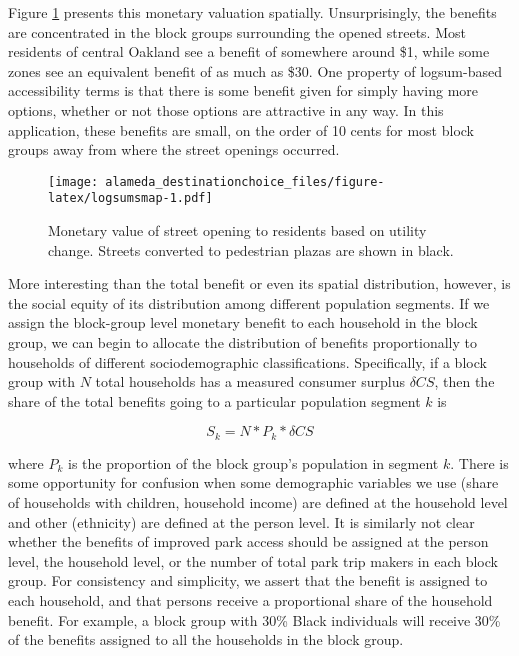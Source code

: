 \documentclass[3p, authoryear, review]{elsarticle} %
\makeatletter
\def\maxwidth{\ifdim\Gin@nat@width>\linewidth\linewidth
\else\Gin@nat@width\fi}
\let\Oldincludegraphics\includegraphics
\renewcommand{\includegraphics}[1]{\Oldincludegraphics[width=\maxwidth]{#1}}
\makeatother
\begin{document}
Figure \ref{fig:logsumsmap} presents this monetary valuation spatially.
Unsurprisingly, the benefits are concentrated in the block groups surrounding
the opened streets. Most residents of central Oakland see a benefit of somewhere
around \$1, while some zones see an equivalent benefit of as much as \$30. One
property of logsum-based accessibility terms is that there is some benefit given
for simply having more options, whether or not those options are attractive in
any way. In this application, these benefits are small, on the order of 10 cents
for most block groups away from where the street openings occurred.

\begin{figure}
\centering
\texttt{[image: alameda\_destinationchoice\_files/figure-latex/logsumsmap-1.pdf]}
\caption{\label{fig:logsumsmap}Monetary value of street opening to residents based on utility change. Streets converted to pedestrian plazas are shown in black.}
\end{figure}

More interesting than the total benefit or even its spatial distribution, however,
is the social equity of its distribution among different population segments.
If we assign the block-group level monetary benefit to each household in the block
group, we can begin to allocate the distribution of benefits proportionally to
households of different sociodemographic classifications. Specifically, if a block
group with \(N\) total households has a measured consumer surplus \(\delta CS\), then the
share of the total benefits going to a particular population segment \(k\) is

\begin{equation}
  S_k = N * P_k * \delta CS
  \label{eq:cs-alloc}
\end{equation}

where \(P_k\) is the proportion of the block group's population in segment \(k\).
There is some opportunity for confusion when some demographic variables we use
(share of households with children, household income) are defined at the
household level and other (ethnicity) are defined at the person level. It is similarly
not clear whether the benefits of improved park access should be assigned at
the person level, the household level, or the number of total park trip makers in
each block group. For consistency and simplicity, we assert that the benefit is
assigned to each household, and that persons receive a proportional share of the
household benefit. For example, a block group with 30\% Black individuals will
receive 30\% of the benefits assigned to all the households in the block group.
\end{document}
